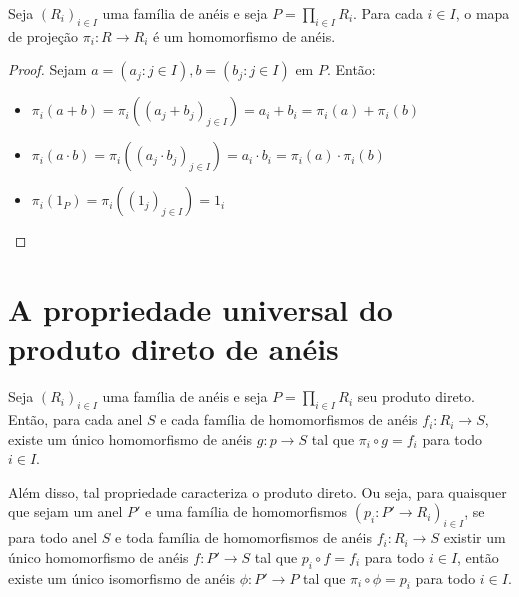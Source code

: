 \begin{lemma}
    Seja $(R_i)_{i \in I}$ uma família de anéis e seja $P=\prod_{i \in I}R_i$.
    Para cada $i \in I$, o mapa de projeção $\pi_i:R\rightarrow R_i$ é um homomorfismo de anéis.
\end{lemma}
\begin{proof}
    Sejam $a=(a_j: j \in I), b=(b_j: j \in I)$ em $P$.
    Então:
    \begin{itemize}
        \item $\pi_i(a+b)=\pi_i((a_j+b_j)_{j \in I})=a_i+b_i=\pi_i(a)+\pi_i(b)$
        \item $\pi_i(a\cdot b)=\pi_i((a_j\cdot b_j)_{j \in I})=a_i\cdot b_i=\pi_i(a)\cdot \pi_i(b)$
        \item $\pi_i(1_P)=\pi_i((1_j)_{j \in I})=1_{i}$
    \end{itemize}
\end{proof}

\section{A propriedade universal do produto direto de anéis}
\begin{theorem}
    Seja $(R_i)_{i \in I}$ uma família de anéis e seja $P=\prod_{i \in I}R_i$ seu produto direto.
    Então, para cada anel $S$ e cada família de homomorfismos de anéis $f_i:R_i\rightarrow S$, existe um único homomorfismo de anéis $g:p\rightarrow S$ tal que $\pi_i\circ g=f_i$ para todo $i \in I$.
    \begin{figure}[H]
        \centering
    \end{figure}

    Além disso, tal propriedade caracteriza o produto direto. Ou seja, para quaisquer que sejam um anel $P'$ e uma família de homomorfismos $(p_i:P'\rightarrow R_i)_{i \in I}$, se para todo anel $S$ e toda família de homomorfismos de anéis $f_i:R_i\rightarrow S$ existir um único homomorfismo de anéis $f:P'\rightarrow S$ tal que $p_i\circ f=f_i$ para todo $i \in I$,
    então existe um único isomorfismo de anéis $\phi: P'\rightarrow P$ tal que $\pi_i\circ \phi=p_i$ para todo $i \in I$.
\end{theorem}

